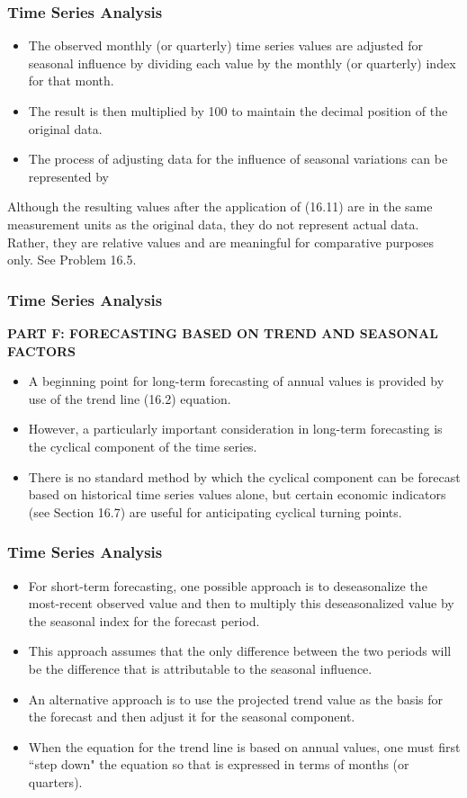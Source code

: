 \documentclass{beamer}
\begin{document}
\begin{frame}
\frametitle{Time Series Analysis}
\begin{itemize}
\item The observed monthly (or quarterly) time series values are adjusted for seasonal influence by dividing each
value by the monthly (or quarterly) index for that month. 
\item The result is then multiplied by 100 to maintain the
decimal position of the original data.
\item The process of adjusting data for the influence of seasonal variations can
be represented by
\end{itemize}

Although the resulting values after the application of (16.11) are in the same measurement units as the
original data, they do not represent actual data. Rather, they are relative values and are meaningful for
comparative purposes only. See Problem 16.5.

\end{frame}
\begin{frame}
\frametitle{Time Series Analysis}
\textbf{PART F: FORECASTING BASED ON TREND AND SEASONAL FACTORS}
\begin{itemize}
\item A beginning point for long-term forecasting of annual values is provided by use of the trend line (16.2)
equation. 
\item However, a particularly important consideration in long-term forecasting is the cyclical component of
the time series. 
\item There is no standard method by which the cyclical component can be forecast based on
historical time series values alone, but certain economic indicators (see Section 16.7) are useful for anticipating
cyclical turning points.
\end{itemize}

\end{frame}
\begin{frame}
\frametitle{Time Series Analysis}
\begin{itemize}
\item For short-term forecasting, one possible approach is to deseasonalize the most-recent observed value and
then to multiply this deseasonalized value by the seasonal index for the forecast period. 
\item This approach assumes
that the only difference between the two periods will be the difference that is attributable to the seasonal
influence. 
\item An alternative approach is to use the projected trend value as the basis for the forecast and then adjust
it for the seasonal component. 
\item When the equation for the trend line is based on annual values, one must first
``step down" the equation so that is expressed in terms of months (or quarters). 
\end{itemize}
\end{frame}
\end{document}
